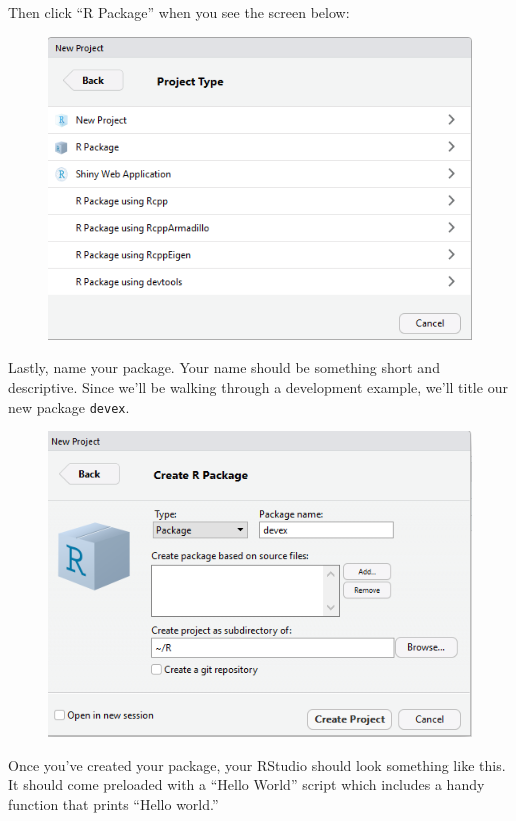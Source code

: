 \documentclass[]{book}
\begin{document}
Then click ``R Package'' when you see the screen below:

\begin{figure}
\centering
\includegraphics{images/packageSS/createproj2.PNG}
\caption{}
\end{figure}

Lastly, name your package. Your name should be something short and
descriptive. Since we'll be walking through a development example, we'll
title our new package \texttt{devex}.

\begin{figure}
\centering
\includegraphics{images/packageSS/createproj3.PNG}
\caption{}
\end{figure}

Once you've created your package, your RStudio should look something
like this. It should come preloaded with a ``Hello World'' script which
includes a handy function that prints ``Hello world.''
\end{document}

